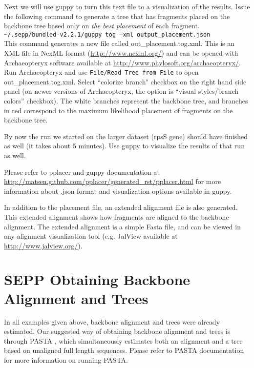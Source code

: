\documentclass[11pt]{article} %
\newcommand{\sepp}{SEPP\xspace}
\newcommand{\ins}[1]{{\tt #1}}
\newcommand{\file}[1]{{\sf #1}}
\newcommand{\pplacer}{pplacer\xspace}
\newcommand{\guppy}{guppy\xspace}
\newcommand{\arch}{Archaeopteryx\xspace}
\newcommand{\sbun}{\textasciitilde/.sepp/bundled-v2.2.1}
\begin{document}
Next we will use \guppy to turn this text file to a visualization of the results. Issue the following command to generate a tree that has fragments placed on the backbone tree based only on {\em the best placement} of each fragment.\\

\ins{\sbun/guppy tog --xml output\_placement.json}\\

This command generates a new file called \file{out\_placement.tog.xml}. This is an XML file in NexML format (\url{http://www.nexml.org/}) and can be opened with \arch software {available at \url{http://www.phylosoft.org/archaeopteryx/}}. 
Run \arch and use \ins{File/Read Tree from File} to open \file{out\_placement.tog.xml}. Select ``colorize branch" checkbox on the right hand side panel (on newer versions of \arch, the option is ``visual styles/branch colors'' checkbox). The white branches represent the backbone tree, and branches in red correspond to the maximum likelihood placement of fragments on the backbone tree. 

By now the run we started on the larger dataset (rpsS gene) should have finished as well (it takes about 5 minutes). Use \guppy to visualize the results of that run as well. 

Please refer to \pplacer and \guppy documentation at \url{http://matsen.github.com/pplacer/generated_rst/pplacer.html} for more information about \file{.json} format and visualization options available in \guppy. 

In addition to the placement file, an extended alignment file is also generated. This extended alignment shows how fragments are aligned to the backbone alignment. The extended alignment is a simple Fasta file, and can be viewed in any alignment visualization tool (e.g. JalView available at \url{http://www.jalview.org/}). 


\section{\sepp Obtaining Backbone Alignment and Trees}
In all examples given above, backbone alignment and trees were already estimated.
Our suggested way of obtaining backbone alignment and trees is through PASTA \cite{sate2},
which simultaneously estimates both an alignment and a tree based on unaligned full length sequences.
Please refer to PASTA documentation for more information on running PASTA. 
\end{document}
